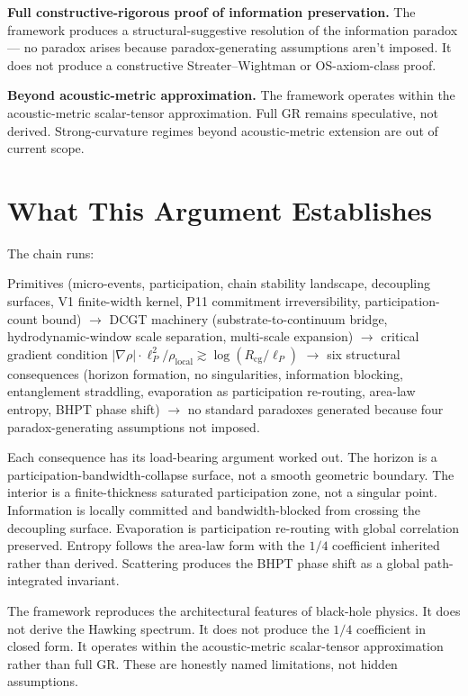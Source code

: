 \documentclass[11pt,a4paper]{article}
\begin{document}
\textbf{Full constructive-rigorous proof of information preservation.} The framework produces a structural-suggestive resolution of the information paradox --- no paradox arises because paradox-generating assumptions aren't imposed. It does not produce a constructive Streater--Wightman or OS-axiom-class proof.

\textbf{Beyond acoustic-metric approximation.} The framework operates within the acoustic-metric scalar-tensor approximation. Full GR remains speculative, not derived. Strong-curvature regimes beyond acoustic-metric extension are out of current scope.

\section{What This Argument Establishes}

The chain runs:

Primitives (micro-events, participation, chain stability landscape, decoupling surfaces, V1 finite-width kernel, P11 commitment irreversibility, participation-count bound) $\to$ DCGT machinery (substrate-to-continuum bridge, hydrodynamic-window scale separation, multi-scale expansion) $\to$ critical gradient condition $|\nabla\rho|\cdot\ell_P^2/\rho_{\mathrm{local}} \gtrsim \log(R_{\mathrm{cg}}/\ell_P)$ $\to$ six structural consequences (horizon formation, no singularities, information blocking, entanglement straddling, evaporation as participation re-routing, area-law entropy, BHPT phase shift) $\to$ no standard paradoxes generated because four paradox-generating assumptions not imposed.

Each consequence has its load-bearing argument worked out. The horizon is a participation-bandwidth-collapse surface, not a smooth geometric boundary. The interior is a finite-thickness saturated participation zone, not a singular point. Information is locally committed and bandwidth-blocked from crossing the decoupling surface. Evaporation is participation re-routing with global correlation preserved. Entropy follows the area-law form with the $1/4$ coefficient inherited rather than derived. Scattering produces the BHPT phase shift as a global path-integrated invariant.

The framework reproduces the architectural features of black-hole physics. It does not derive the Hawking spectrum. It does not produce the $1/4$ coefficient in closed form. It operates within the acoustic-metric scalar-tensor approximation rather than full GR. These are honestly named limitations, not hidden assumptions.
\end{document}
